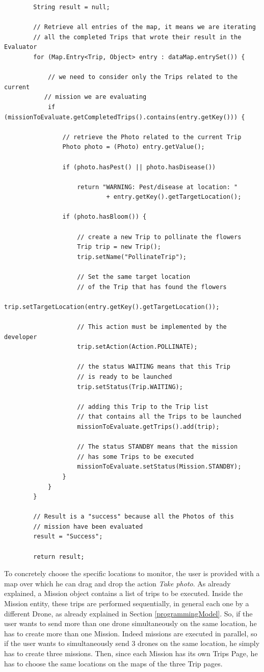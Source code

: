 \begin{lstlisting}
		String result = null;

		// Retrieve all entries of the map, it means we are iterating
        // all the completed Trips that wrote their result in the Evaluator
		for (Map.Entry<Trip, Object> entry : dataMap.entrySet()) {

			// we need to consider only the Trips related to the current
           // mission we are evaluating
			if (missionToEvaluate.getCompletedTrips().contains(entry.getKey())) {
				
				// retrieve the Photo related to the current Trip
				Photo photo = (Photo) entry.getValue();
				
				if (photo.hasPest() || photo.hasDisease())
					
					return "WARNING: Pest/disease at location: "
							+ entry.getKey().getTargetLocation();

				if (photo.hasBloom()) {

					// create a new Trip to pollinate the flowers
					Trip trip = new Trip();
					trip.setName("PollinateTrip");
                    
                    // Set the same target location
                    // of the Trip that has found the flowers
					trip.setTargetLocation(entry.getKey().getTargetLocation());
                    
                    // This action must be implemented by the developer
					trip.setAction(Action.POLLINATE);
                    
                    // the status WAITING means that this Trip
                    // is ready to be launched
					trip.setStatus(Trip.WAITING);

					// adding this Trip to the Trip list
                    // that contains all the Trips to be launched
					missionToEvaluate.getTrips().add(trip);
                    
					// The status STANDBY means that the mission
                    // has some Trips to be executed
					missionToEvaluate.setStatus(Mission.STANDBY);
				}
			}
		}

		// Result is a "success" because all the Photos of this 
        // mission have been evaluated
		result = "Success";
        
		return result;
\end{lstlisting}

To concretely choose the specific locations to monitor, the user is provided with a map over which he can drag and drop the action \textit{Take photo}.
As already explained, a Mission object contains a list of trips to be executed.
Inside the Mission entity, these trips are performed sequentially, in general each one by a different Drone, as already explained in Section \ref{programmingModel}.
So, if the user wants to send more than one drone simultaneously on the same location, he has to create more than one Mission.
Indeed missions are executed in parallel, so if the user wants to simultaneously send 3 drones on the same location, he simply has to create three missions.
Then,  since each Mission has its own Trips Page, he has to choose the same locations on the maps of the three Trip pages.


